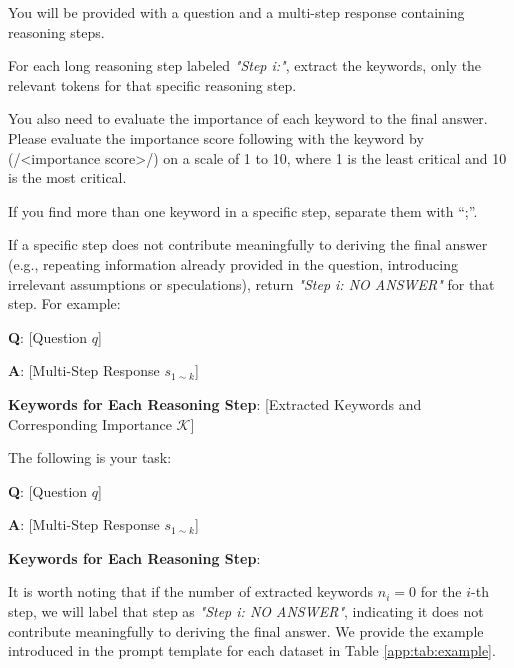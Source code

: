 \documentclass[11pt]{article}
\begin{document}
\begin{tcolorbox}[
    colframe=black,  %
    colback=white,   %
    rounded corners=north, %
    arc=1mm, %
    boxrule=.4mm, %
    width=\linewidth, %
    coltitle=black, 
    colbacktitle=white,
    title={\textbf{Step 2 \& Step 3: Keywords Extractions and Importance Scoring}}, %
    fonttitle=\bfseries, %
]

You will be provided with a question and a multi-step response containing reasoning steps. 

For each long reasoning step labeled \textit{"Step i:"}, extract the keywords, only the relevant tokens for that specific reasoning step.

You also need to evaluate the importance of each keyword to the final answer. Please evaluate the importance score following with the keyword by (/<importance score>/) on a scale of 1 to 10, where 1 is the least critical and 10 is the most critical.

If you find more than one keyword in a specific step, separate them with “;”.

If a specific step does not contribute meaningfully to deriving the final answer (e.g., repeating information already provided in the question, introducing irrelevant assumptions or speculations), return \textit{"Step i: NO ANSWER"} for that step. For example:

\vspace{5pt}

\textbf{Q}: [Question $q$]  

\textbf{A}: [Multi-Step Response $s_{1 \sim k}$]

\textbf{Keywords for Each Reasoning Step}: [Extracted Keywords and Corresponding Importance $\mathcal{K}$]

\vspace{5pt}
The following is your task:

\textbf{Q}: [Question $q$]  

\textbf{A}: [Multi-Step Response $s_{1 \sim k}$]

\textbf{Keywords for Each Reasoning Step}:
\end{tcolorbox}

It is worth noting that if the number of extracted keywords $n_i=0$ for the $i$-th step, we will label that step as \textit{"Step i: NO ANSWER"}, indicating it does not contribute meaningfully to deriving the final answer.
We provide the example introduced in the prompt template for each dataset in Table \ref{app:tab:example}.
\end{document}
